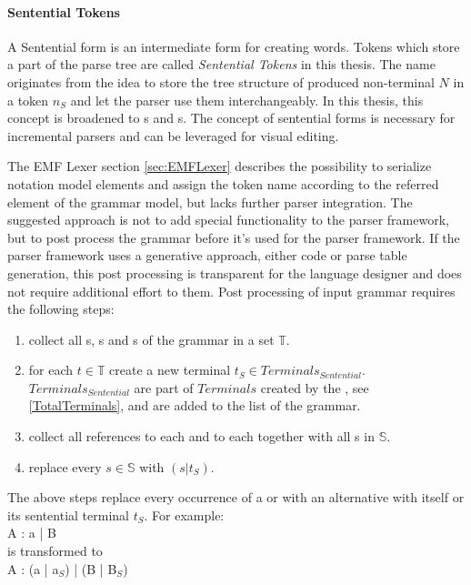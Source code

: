 \paragraph{Sentential Tokens} \label{SententialTokens}
A Sentential form is an intermediate form for creating words. Tokens which store a part of the parse tree are called \emph{Sentential Tokens} in this thesis. The name originates from the idea to store the tree structure of produced non-terminal $N$ in a token $n_S$ and let the parser use them interchangeably. In this thesis, this concept is broadened to s and s. The concept of sentential forms is necessary for incremental parsers and can be leveraged for visual editing.
 
The EMF Lexer section \ref{sec:EMFLexer} describes the possibility to serialize notation model elements and assign the token name according to the referred element of the grammar model, but lacks further parser integration. The suggested approach is not to add special functionality to the parser framework, but to post process the grammar before it's used for the parser framework. If the parser framework uses a generative approach, either code or parse table generation, this post processing is transparent for the language designer and does not require additional effort to them. 
Post processing of input grammar requires the following steps:
\begin{enumerate}
	\item collect all s, s and s of the grammar in a set $\mathbb{T}$.
	\item for each $t \in \mathbb{T}$ create a new terminal $t_S \in Terminals_{Sentential}$.\\ $Terminals_{Sentential}$ are part of $Terminals$ created by the , see \ref{TotalTerminals}, and are added to the  list of the grammar.
	\item collect all references to each  and to each  together with all s in $\mathbb{S}$.
	\item replace every $s \in \mathbb{S}$ with $(s | t_S)$. \label{SententialTokenSubstitution}
\end{enumerate}
  
The above steps replace every occurrence of a  or  with an alternative with itself or its sentential terminal $t_S$. 
For example:\\
A : a | B \\
is transformed to  \\
A : (a | a$_S$) | (B | B$_S$)

